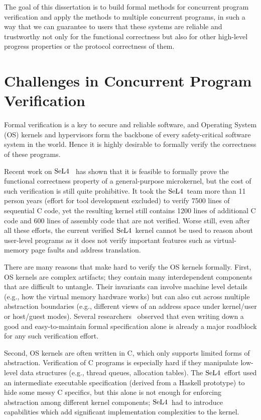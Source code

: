 
The goal of this dissertation is to build formal methods for concurrent program verification and apply the methods to multiple concurrent programs,
in such a way that we can guarantee to users that these systems are reliable and trustworthy not only for the functional correctness but also for 
other high-level progress properties or the protocol correctness of them. 

\section{Challenges in Concurrent Program Verification}
\label{chapter:introduction:sec:challenges-in-concurrent-program-verification}


Formal verification is a key to secure and reliable software, and  Operating System (OS) kernels and hypervisors form the backbone of every safety-critical software system in the world. 
Hence it is highly desirable to formally verify the correctness of these programs.

Recent work on $\mathrm{SeL4}$~\cite{klein2009sel4,klein14} has shown that it is feasible to formally prove the functional correctness property of a general-purpose microkernel, but the cost of such verification is still quite prohibitive. 
It took the $\mathrm{SeL4}$\ team more than 11 person years (effort for tool development excluded) to verify 7500 lines of sequential C code, yet the resulting kernel still contains 1200 lines of additional C code and 600 lines of assembly code that are not verified. 
Worse still, even after all these efforts, the current verified $\mathrm{SeL4}$\ kernel cannot be used to reason about user-level programs as it does not verify important features such as virtual-memory page faults and address translation.

There are many reasons that make hard to verify the OS kernels formally.
First, OS kernels are complex artifacts; they contain many interdependent components that are difficult to untangle.
Their invariants can involve machine level details (e.g., how the virtual memory hardware works) but can also cut across multiple abstraction boundaries (e.g., different views of an address space under kernel/user or host/guest modes).
Several researchers~\cite{baumann12,vaynberg12} observed that even writing down a good and easy-to-maintain formal specification alone is already a major roadblock for any such verification effort.

Second, OS kernels are often written in C, which only supports limited forms of abstraction.  Verification of C programs is especially hard if they manipulate low-level data structures (e.g., thread queues, allocation tables).  
The $\mathrm{SeL4}$\ effort used an intermediate executable specification (derived from a Haskell prototype) to hide some messy C specifics, but this alone is not enough for enforcing abstraction among different kernel components; $\mathrm{SeL4}$\ had to introduce capabilities which add significant implementation complexities to the kernel.

